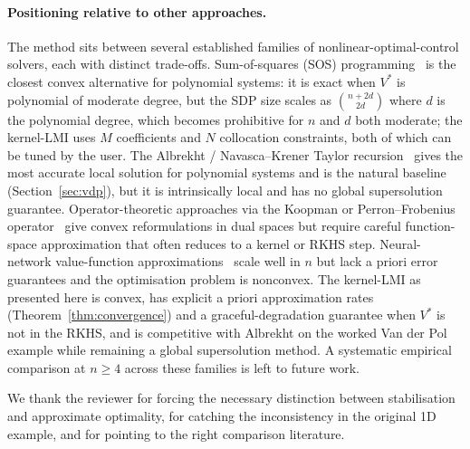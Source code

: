 \documentclass[11pt]{article}
\begin{document}
\paragraph{Positioning relative to other approaches.} The method sits between several established families of nonlinear-optimal-control solvers, each with distinct trade-offs. Sum-of-squares (SOS) programming~\cite{parrilo_thesis, parrilo_sos} is the closest convex alternative for polynomial systems: it is exact when $V^*$ is polynomial of moderate degree, but the SDP size scales as $\binom{n+2d}{2d}$ where $d$ is the polynomial degree, which becomes prohibitive for $n$ and $d$ both moderate; the kernel-LMI uses $M$ coefficients and $N$ collocation constraints, both of which can be tuned by the user. The Albrekht / Navasca--Krener Taylor recursion~\cite{albrekht_1961, navasca_krener_2000} gives the most accurate local solution for polynomial systems and is the natural baseline (Section~\ref{sec:vdp}), but it is intrinsically local and has no global supersolution guarantee. Operator-theoretic approaches via the Koopman or Perron--Frobenius operator~\cite{vaidya_koopman_hj_2025, huang_vaidya_2022, moyalan_choi_chen_vaidya_2023} give convex reformulations in dual spaces but require careful function-space approximation that often reduces to a kernel or RKHS step. Neural-network value-function approximations~\cite{hjb_rkhs, kang_gong_nakamura_fahroo_survey} scale well in $n$ but lack a priori error guarantees and the optimisation problem is nonconvex. The kernel-LMI as presented here is convex, has explicit a priori approximation rates (Theorem~\ref{thm:convergence}) and a graceful-degradation guarantee when $V^*$ is not in the RKHS, and is competitive with Albrekht on the worked Van der Pol example while remaining a global supersolution method. A systematic empirical comparison at $n \geq 4$ across these families is left to future work.

We thank the reviewer for forcing the necessary distinction between stabilisation and approximate optimality, for catching the inconsistency in the original 1D example, and for pointing to the right comparison literature.


\end{document}
